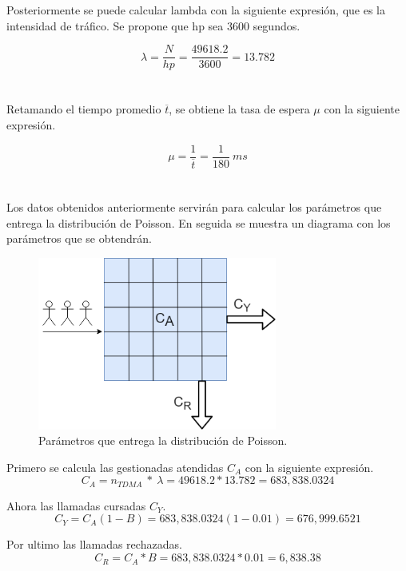 \documentclass[11pt,letterpaper]{article}
\begin{document}
\newpage
Posteriormente se puede calcular lambda con la siguiente expresión, que es la 
intensidad de tráfico. Se propone que hp sea 3600 segundos.

\begin{equation}
    \lambda=\frac{N}{hp}=\frac{49618.2}{3600}=13.782
\end{equation}
\\ \\
Retamando el tiempo promedio $\overline{t}$, se obtiene la tasa de espera $\mu$ 
con la siguiente expresión. 

\begin{equation}
    \mu=\frac{1}{\overline{t}}=\frac{1}{180} \ ms
\end{equation}
\\ \\
Los datos obtenidos anteriormente servirán para calcular los parámetros que entrega 
la distribución de Poisson. En seguida se muestra un diagrama con los parámetros que se 
obtendrán.


\begin{figure}[ht]
    \centering
    \includegraphics[width=0.7\textwidth]{imagenes/pos.png}
    \caption{Parámetros que entrega la distribución de Poisson.}
\end{figure}

\newpage
Primero se calcula las gestionadas atendidas $C_{A}$ con la siguiente expresión.
\begin{equation}
    C_A=n_{TDMA} \ * \ \lambda = 49618.2 * 13.782= 683,838.0324
\end{equation}

Ahora las llamadas cursadas $C_Y$.
\begin{equation}
    C_Y=C_A(1-B)=683,838.0324(1-0.01)=676,999.6521
\end{equation}

Por ultimo las llamadas rechazadas.
\begin{equation}
    C_R=C_A*B=683,838.0324*0.01=6,838.38
\end{equation}
\end{document}
